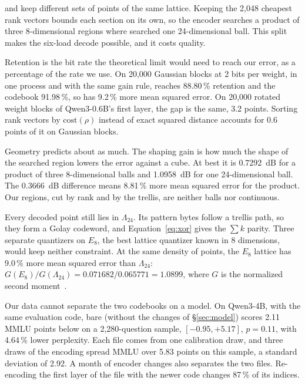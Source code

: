 \Tetra{} and \Planes{} keep different sets of points of the same lattice.
Keeping the 2{,}048 cheapest rank vectors bounds each section on its own, so
the encoder searches a product of three 8-dimensional regions where \Planes{}
searched one 24-dimensional ball. This split makes the six-load decode
possible, and it costs quality.

Retention is the bit rate the theoretical limit would need to reach our error,
as a percentage of the rate we use. On 20{,}000 Gaussian blocks at 2 bits per
weight, in one process and with the same gain rule, \Tetra{} reaches
88.80\,\% retention and the \Planes{} codebook 91.98\,\%, so \Tetra{} has
9.2\,\% more mean squared error. On 20{,}000 rotated weight blocks of
Qwen3-0.6B's first layer, the gap is the same, 3.2 points. Sorting rank
vectors by $\mathrm{cost}(\rho)$ instead of exact squared distance accounts
for 0.6 points of it on Gaussian blocks.

Geometry predicts about as much. The shaping gain is how much the shape of the
searched region lowers the error against a cube. At best it is 0.7292~dB for a
product of three 8-dimensional balls and 1.0958~dB for one 24-dimensional
ball. The 0.3666~dB difference means 8.81\,\% more mean squared error for the
product. Our regions, cut by rank and by the trellis, are neither balls nor
continuous.

Every decoded point still lies in $\Lambda_{24}$. Its pattern bytes follow a
trellis path, so they form a Golay codeword, and Equation~\eqref{eq:xor} gives
the $\sum k$ parity. Three separate quantizers
on $E_8$, the best lattice quantizer known in 8 dimensions, would keep neither
constraint. At the same density of points, the $E_8$ lattice has 9.0\,\% more mean
squared error than $\Lambda_{24}$: $G(E_8)/G(\Lambda_{24}) = 0.071682/0.065771
= 1.0899$, where $G$ is the normalized second
moment~\citep[Table~2.3]{conway1999sphere}.

Our data cannot separate the two codebooks on a model. On Qwen3-4B, with the
same evaluation code, bare \Tetra{} (without the changes of \S\ref{sec:model})
scores 2.11 MMLU points below \Planes{} on a 2{,}280-question sample,
$[-0.95, +5.17]$, $p=0.11$, with 4.64\,\% lower perplexity. Each file comes
from one calibration draw, and three draws of the \Planes{} encoding spread
MMLU over 5.83 points on this sample, a standard deviation of 2.92. A month of
encoder changes also separates the two files. Re-encoding the first layer of
the \Planes{} file with the newer code changes 87\,\% of its indices.

